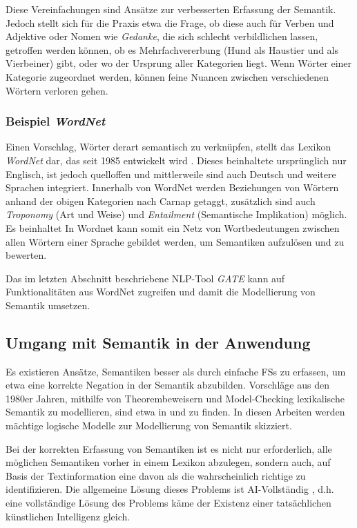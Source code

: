 \documentclass[12pt]{report}
\begin{document}
Diese Vereinfachungen sind Ansätze zur verbesserten Erfassung der Semantik.  Jedoch stellt sich für die Praxis etwa die Frage, ob diese auch für Verben und Adjektive oder Nomen wie \textit{\glqq  Gedanke\grqq{}}, die sich schlecht verbildlichen lassen, getroffen werden können, ob es \glqq  Mehrfachvererbung\grqq{} (Hund als Haustier und als Vierbeiner) gibt, oder wo der Ursprung aller Kategorien liegt. Wenn Wörter einer Kategorie zugeordnet werden, können feine Nuancen zwischen verschiedenen Wörtern verloren gehen. 


\subsubsection{Beispiel \textit{WordNet}}
Einen Vorschlag, Wörter derart semantisch zu verknüpfen, stellt das Lexikon \textit{WordNet} dar, das seit 1985 entwickelt wird \cite{mil95}. Dieses beinhaltete ursprünglich nur Englisch, ist jedoch quelloffen und mittlerweile sind auch Deutsch und weitere Sprachen integriert. Innerhalb von WordNet werden Beziehungen von Wörtern anhand der obigen Kategorien nach Carnap getaggt, zusätzlich sind auch \textit{Troponomy} (Art und Weise) und \textit{Entailment} (Semantische Implikation) möglich. Es beinhaltet In Wordnet kann somit ein Netz von Wortbedeutungen zwischen allen Wörtern einer Sprache gebildet werden, um Semantiken aufzulösen und zu bewerten. 

Das im letzten Abschnitt beschriebene NLP-Tool \textit{GATE} kann auf Funktionalitäten aus WordNet zugreifen und damit die Modellierung von Semantik umsetzen.

\subsection{Umgang mit Semantik in der Anwendung}
Es existieren Ansätze, Semantiken besser als durch einfache FSs zu erfassen, um etwa eine korrekte Negation in der Semantik abzubilden. Vorschläge aus den 1980er Jahren, mithilfe von Theorembeweisern und Model-Checking lexikalische Semantik zu modellieren, sind etwa in \cite{sb88} und \cite{kn85} zu finden. In diesen Arbeiten werden mächtige logische Modelle zur Modellierung von Semantik skizziert. 

Bei der korrekten Erfassung von Semantiken ist es nicht nur erforderlich, alle möglichen Semantiken vorher in einem Lexikon abzulegen, sondern auch, auf Basis der Textinformation eine davon als die wahrscheinlich richtige zu identifizieren. Die allgemeine Lösung dieses Problems ist AI-Vollständig \cite{cop04}, d.h. eine vollständige Lösung des Problems käme der Existenz einer tatsächlichen künstlichen Intelligenz gleich. 
\end{document}
